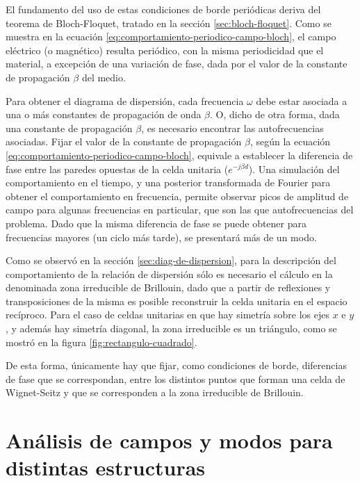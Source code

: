 El fundamento del uso de estas condiciones de borde periódicas deriva del teorema de Bloch-Floquet, tratado en la sección \ref{sec:bloch-floquet}. Como se muestra en la ecuación \ref{eq:comportamiento-periodico-campo-bloch}, el campo eléctrico (o magnético) resulta periódico, con la misma periodicidad que el material, a excepción de una variación de fase, dada por el valor de la constante de propagación $\beta$ del medio.

Para obtener el diagrama de dispersión, cada frecuencia $\omega$ debe estar asociada a una o más constantes de propagación de onda $\beta$. O, dicho de otra forma, dada una constante de propagación $\beta$, es necesario encontrar las autofrecuencias asociadas. Fijar el valor de la constante de propagación $\beta$, según la ecuación \ref{eq:comportamiento-periodico-campo-bloch}, equivale a establecer la diferencia de fase entre las paredes opuestas de la celda unitaria ($e^{-j\beta d}$). Una simulación del comportamiento en el tiempo, y una posterior transformada de Fourier para obtener el comportamiento en frecuencia, permite observar picos de amplitud de campo para algunas frecuencias en particular, que son las que autofrecuencias del problema. Dado que la misma diferencia de fase se puede obtener para frecuencias mayores (un ciclo más tarde), se presentará más de un modo.

Como se observó en la sección \ref{sec:diag-de-dispersion}, para la descripción del comportamiento de la relación de dispersión sólo es necesario el cálculo en la denominada zona irreducible de Brillouin, dado que a partir de reflexiones y transposiciones de la misma es posible reconstruir la celda unitaria en el espacio recíproco. Para el caso de celdas unitarias en que hay simetría sobre los ejes $x$ e $y$, y además hay simetría diagonal, la zona irreducible es un triángulo, como se mostró en la figura \ref{fig:rectangulo-cuadrado}.

De esta forma, únicamente hay que fijar, como condiciones de borde, diferencias de fase que se correspondan, entre los distintos puntos que forman una celda de Wignet-Seitz y que se corresponden a la zona irreducible de Brillouin.



\section{Análisis de campos y modos para distintas estructuras}
\label{sec_estructuras_propuestas}

